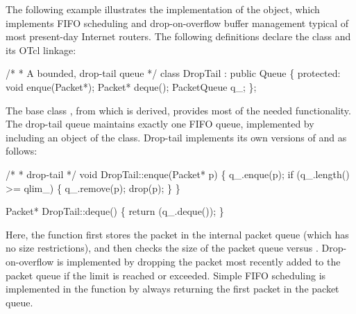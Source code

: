 The following example illustrates the implementation of the
 object,
which implements FIFO scheduling and
drop-on-overflow buffer management typical of most present-day
Internet routers.
The following definitions declare the class and its OTcl linkage:
\begin{program}
        /*
         * {\cf A bounded, drop-tail queue}
         */
        class DropTail : public Queue \{
         protected:
                void enque(Packet*);
                Packet* deque();
                PacketQueue q_;
        \};
\end{program}
The base class ,
from which  is derived, provides most
of the needed functionality.
The drop-tail queue maintains exactly one FIFO queue, implemented
by including an object of the  class.
Drop-tail implements its own versions of  and 
as follows:
\begin{program}
        /*
         * {\cf drop-tail}
         */
        void DropTail::enque(Packet* p)
        \{
                q_.enque(p);
                if (q_.length() >= qlim_) \{
                        q_.remove(p);
                        drop(p);
                \}
        \}

        Packet* DropTail::deque()
        \{
                return (q_.deque());
        \}
\end{program}
Here, the  function first stores the packet in the
internal packet queue (which has no size restrictions), and then
checks the size of the packet queue versus .
Drop-on-overflow is implemented by dropping the packet most recently
added to the packet queue if the limit is reached or exceeded.
Simple FIFO scheduling is implemented in the  function
by always returning the first packet in the packet queue.

\endinput
